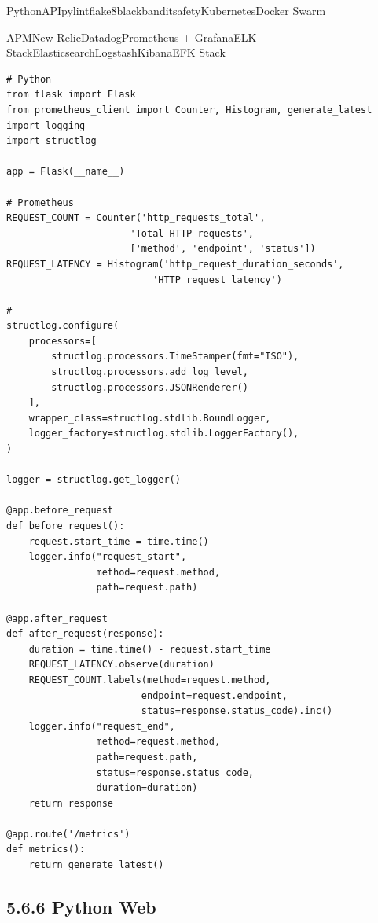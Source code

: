 Python\important{}API\important{}pylintflake8black\important{}banditsafety\important{}KubernetesDocker
Swarm

\important{}\important{}APMNew RelicDatadogPrometheus +
Grafana\important{}ELK StackElasticsearchLogstashKibanaEFK
Stack\important{}\important{}

\begin{lstlisting}[style=python]
# Python
from flask import Flask
from prometheus_client import Counter, Histogram, generate_latest
import logging
import structlog

app = Flask(__name__)

# Prometheus
REQUEST_COUNT = Counter('http_requests_total', 
                      'Total HTTP requests', 
                      ['method', 'endpoint', 'status'])
REQUEST_LATENCY = Histogram('http_request_duration_seconds',
                          'HTTP request latency')

# 
structlog.configure(
    processors=[
        structlog.processors.TimeStamper(fmt="ISO"),
        structlog.processors.add_log_level,
        structlog.processors.JSONRenderer()
    ],
    wrapper_class=structlog.stdlib.BoundLogger,
    logger_factory=structlog.stdlib.LoggerFactory(),
)

logger = structlog.get_logger()

@app.before_request
def before_request():
    request.start_time = time.time()
    logger.info("request_start", 
                method=request.method, 
                path=request.path)

@app.after_request
def after_request(response):
    duration = time.time() - request.start_time
    REQUEST_LATENCY.observe(duration)
    REQUEST_COUNT.labels(method=request.method,
                        endpoint=request.endpoint,
                        status=response.status_code).inc()
    logger.info("request_end",
                method=request.method,
                path=request.path,
                status=response.status_code,
                duration=duration)
    return response

@app.route('/metrics')
def metrics():
    return generate_latest()
\end{lstlisting}

\hypertarget{python-web-3}{%
\subsection{5.6.6 Python Web}\label{python-web-3}}

\hypertarget{section-87}{%
\subsubsection{}\label{section-87}}

